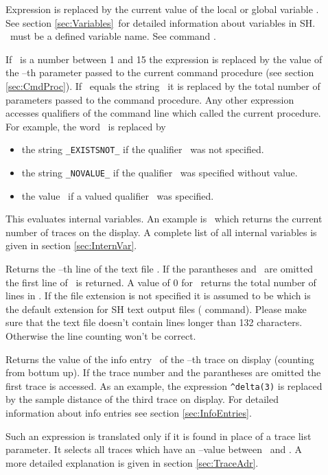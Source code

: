 \begin{description}
\item[]
   Expression is replaced by the current value
   of the local or global variable .  See
   section \ref{sec:Variables}\ for detailed information
   about variables in SH.  \ must be a defined
   variable name.  See command .
\item[]
   If \ is a number between 1
   and 15 the expression is replaced by the value of the
   --th parameter passed to the current command
   procedure (see section \ref{sec:CmdProc}).  If \
   equals the string \ it is replaced by the total
   number of parameters passed to the command procedure.  Any
   other expression accesses qualifiers of the command line which
   called the current procedure.  For example, the word
   \ is replaced by
   \begin{itemize}
   \item  the string \verb+_EXISTSNOT_+ if the qualifier
      \ was not specified.
   \item  the string \verb+_NOVALUE_+ if the qualifier
      \exm{/example}\ was specified without value.
   \item  the value \ if a valued qualifier
      \ was specified.
   \end{itemize}
\item[]
   This evaluates internal variables.  An example
   is \ which returns the current number of traces
   on the display.  A complete list of all internal variables is
   given in section \ref{sec:InternVar}.
\item[]
   Returns the --th line of the text file
   .  If the parantheses and \ are omitted
   the first line of \ is returned.  A value of 0 for
   \exm{<line>}\ returns the total number of lines in \exm{<file>}.
   If the file extension is
   not specified it is assumed to be  which is the
   default extension for SH text output files ( command).
   Please make sure that the text file doesn't contain lines
   longer than 132 characters.  Otherwise the line counting won't
   be correct.
\item[]
   Returns the value of the info entry \ of the
   --th trace on display (counting from bottum up).
   If the trace number and the parantheses are omitted the first
   trace is accessed.  As an example, the expression
   \verb+^delta(3)+ is replaced by the sample distance
   of the third trace on display.  For detailed information about
   info entries see section \ref{sec:InfoEntries}.
\item[]
   Such an expression is translated only if it is found in place
   of a trace list parameter.  It selects all traces which have
   an --value between \ and \exm{<end>}.
   A more detailed explanation is given in section \ref{sec:TraceAdr}.
\end{description}

